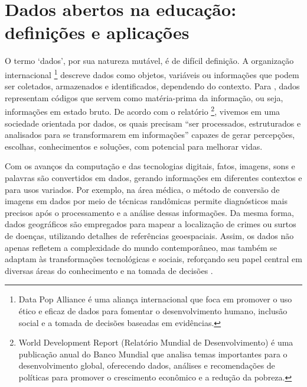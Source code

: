 \documentclass[portuguese]{textolivre}
\begin{document}
\section{Dados abertos na educação: definições e aplicações}\label{sec-normas}
O termo ‘dados’, por sua natureza mutável, é de difícil definição. A organização internacional \textcite{datapop2015}\footnote{Data Pop Alliance é uma aliança internacional que foca em promover o uso ético e eficaz de dados para fomentar o desenvolvimento humano, inclusão social e a tomada de decisões baseadas em evidências.} descreve dados como objetos, variáveis ou informações que podem ser coletados, armazenados e identificados, dependendo do contexto. Para \textcite{silva2007}, dados representam códigos que servem como matéria-prima da informação, ou seja, informações em estado bruto. De acordo com o relatório \cite[p.~24]{world_development_report2021}\footnote{World Development Report (Relatório Mundial de Desenvolvimento) é uma publicação anual do Banco Mundial que analisa temas importantes para o desenvolvimento global, oferecendo dados, análises e recomendações de políticas para promover o crescimento econômico e a redução da pobreza.}, vivemos em uma sociedade orientada por dados, os quais precisam “ser processados, estruturados e analisados para se transformarem em informações” capazes de gerar percepções, escolhas, conhecimentos e soluções, com potencial para melhorar vidas. 

Com os avanços da computação e das tecnologias digitais, fatos, imagens, sons e palavras são convertidos em dados, gerando informações em diferentes contextos e para usos variados. Por exemplo, na área médica, o método de conversão de imagens em dados por meio de técnicas randômicas permite diagnósticos mais precisos após o processamento e a análise dessas informações. Da mesma forma, dados geográficos são empregados para mapear a localização de crimes ou surtos de doenças, utilizando detalhes de referências geoespaciais. Assim, os dados não apenas refletem a complexidade do mundo contemporâneo, mas também se adaptam às transformações tecnológicas e sociais, reforçando seu papel central em diversas áreas do conhecimento e na tomada de decisões \cite{world_development_report2021}.
\end{document}
